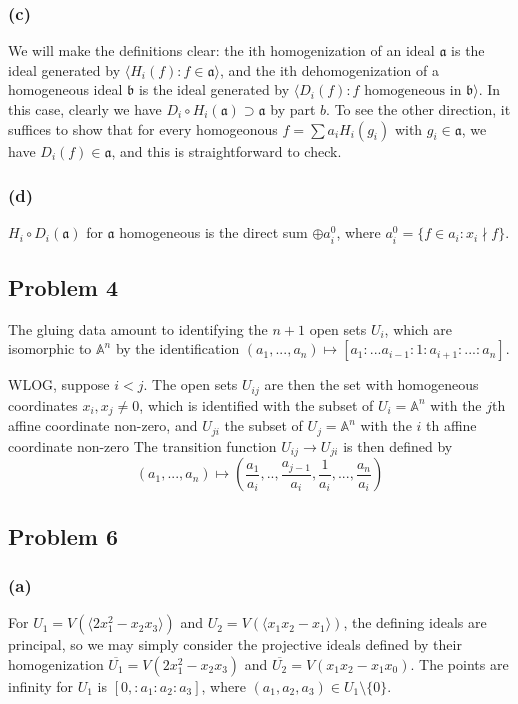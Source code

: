 \documentclass{article}
\theoremstyle{definition}
\theoremstyle{definition}
\theoremstyle{definition}
\theoremstyle{definition}
\theoremstyle{definition}
\theoremstyle{definition}
\theoremstyle{definition}
\begin{document}
\subsubsection*{(c)}
We will make the definitions clear: the ith homogenization of an ideal $\mathfrak{a}$ is the ideal generated by $\langle H_i(f): f\in \mathfrak{a} \rangle$, and the ith dehomogenization of a homogeneous ideal $\mathfrak{b}$ is the ideal generated by $\langle D_i(f): f\textrm{ homogeneous in } \mathfrak{b} \rangle$. In this case, clearly we have $D_i\circ H_i(\mathfrak{a})\supset \mathfrak{a}$ by part $b$. To see the other direction, it suffices to show that for every homogeonous $f=\sum a_iH_i(g_i)$ with $g_i\in \mathfrak{a}$, we have $D_i(f)\in \mathfrak{a}$, and this is straightforward to check. 




\subsubsection*{(d)}
$H_i\circ D_i(\mathfrak{a})$ for $\mathfrak{a}$ homogeneous is the direct sum $\oplus a_i^{0}$, where $a_i^{0}=\{f\in a_i: x_i\nmid f\}$.



\subsection*{Problem 4}
The gluing data amount to identifying the $n+1$ open sets $U_i$, which are isomorphic to $\mathbb{A}^n$ by the identification $(a_1,...,a_n)\mapsto [a_1:...a_{i-1}:1:a_{i+1}:...:a_n]$.

WLOG, suppose $i<j$. The open sets $U_{ij}$ are then the set with homogeneous coordinates $x_i, x_j\neq 0$, which is identified with the subset of $U_i=\mathbb{A}^n$ with the $j$th affine coordinate non-zero, and $U_{ji}$ the subset of $U_j=\mathbb{A}^n$ with the $i$ th affine coordinate non-zero The transition function $U_{ij}\to U_{ji}$ is then defined by 
\[(a_1,...,a_n)\mapsto (\frac{a_1}{a_i},..,\frac{a_{j-1}}{a_i},\frac{1}{a_i},...,\frac{a_n}{a_i})\]



\subsection*{Problem 6}
\subsubsection*{(a)}
For $U_1=V(\langle2x_1^2-x_2x_3 \rangle)$ and $U_2=V(\langle x_1x_2-x_1 \rangle)$, the defining ideals are principal, so we may simply consider the projective ideals defined by their homogenization $\overline{U_1}=V(2x_1^2-x_2x_3)$ and $\overline{U_2}=V(x_1x_2-x_1x_0)$. The points are infinity for $U_1$ is $[0,:a_1:a_2:a_3]$, where $(a_1,a_2,a_3)\in U_1\setminus \{0\}$. 
\end{document}
